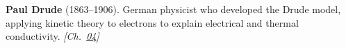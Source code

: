 \textbf{Paul Drude} (1863–1906). German physicist who developed the Drude model, applying kinetic theory to electrons to explain electrical and thermal conductivity. \emph{[Ch.~\hyperref[ch:energytransmission]{04}]}

